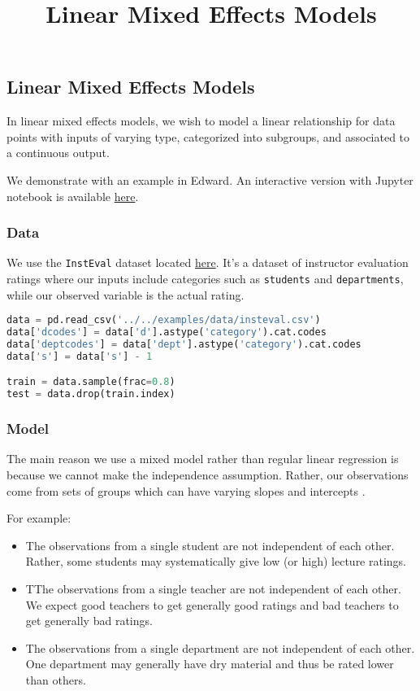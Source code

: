 \title{Linear Mixed Effects Models}

\subsection{Linear Mixed Effects Models}

In linear mixed effects models, we wish to model a linear relationship for data points with inputs of varying type, categorized into subgroups, and associated to a continuous output.

We demonstrate with an example in Edward.
An interactive version with Jupyter notebook is available
\href{http://nbviewer.jupyter.org/github/blei-lab/edward/blob/master/docs/notebooks/linear_mixed_effects_models.ipynb}{here}.

\subsubsection{Data}

We use the \texttt{InstEval} dataset located \href{https://github.com/blei-lab/edward/blob/master/examples/data/insteval.csv}{here}. It's a dataset of instructor evaluation ratings where our inputs include categories such as \texttt{students} and \texttt{departments}, while our observed variable is the actual rating.

\begin{lstlisting}[language=Python]
data = pd.read_csv('../../examples/data/insteval.csv')
data['dcodes'] = data['d'].astype('category').cat.codes
data['deptcodes'] = data['dept'].astype('category').cat.codes
data['s'] = data['s'] - 1

train = data.sample(frac=0.8)
test = data.drop(train.index)
\end{lstlisting}

\subsubsection{Model}

The main reason we use a mixed model rather than regular linear regression is because we cannot make the independence assumption. Rather, our observations come from sets of groups which can have varying slopes and intercepts \citep{gelman2006data}.

For example:
\begin{itemize}
\item The observations from a single student are not independent of each other. Rather, some students may systematically give low (or high) lecture ratings.
\item TThe observations from a single teacher are not independent of each other. We expect good teachers to get generally good ratings and bad teachers to get generally bad ratings.
\item The observations from a single department are not independent of each other. One department may generally have dry material and thus be rated lower than others.
\end{itemize}


